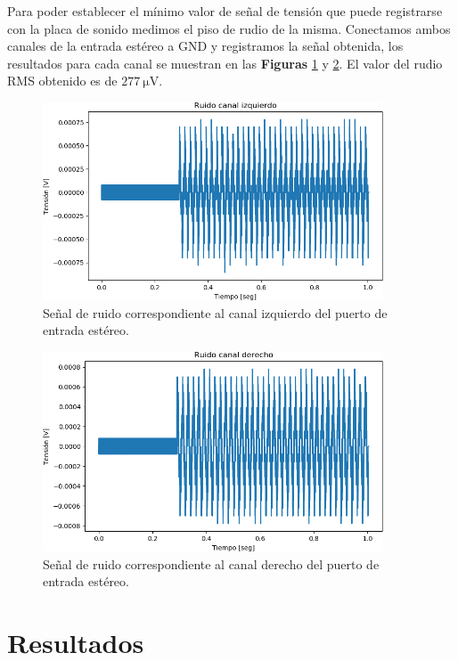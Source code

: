 \documentclass[a4paper,11pt]{article}
\begin{document}
Para poder establecer el mínimo valor de señal de tensión que puede
registrarse con la placa de sonido medimos el piso de rudio de la misma.
Conectamos ambos canales de la entrada estéreo a GND y registramos la
señal obtenida, los resultados para cada canal se muestran en las
\textbf{Figuras} \ref{fig:RuidoIzquierdo} y \ref{fig:RuidoDerecho}.
El valor del rudio RMS obtenido es de $\SI{277}{\uV}$.

	\begin{figure}[h]
		\centering
		\includegraphics[width=0.9\textwidth]{imagenes/RuidoCanalIzquierdo.png}
		\caption{Señal de ruido correspondiente al canal izquierdo del
puerto de entrada estéreo.}
        \label{fig:RuidoIzquierdo}
	\end{figure}
	
	\begin{figure}[h]
		\centering
		\includegraphics[width=0.9\textwidth]{imagenes/RuidoCanalDerecho.png}
		\caption{Señal de ruido correspondiente al canal derecho del
puerto de entrada estéreo.}
        \label{fig:RuidoDerecho}
	\end{figure}
\clearpage

\section{Resultados}
\end{document}
